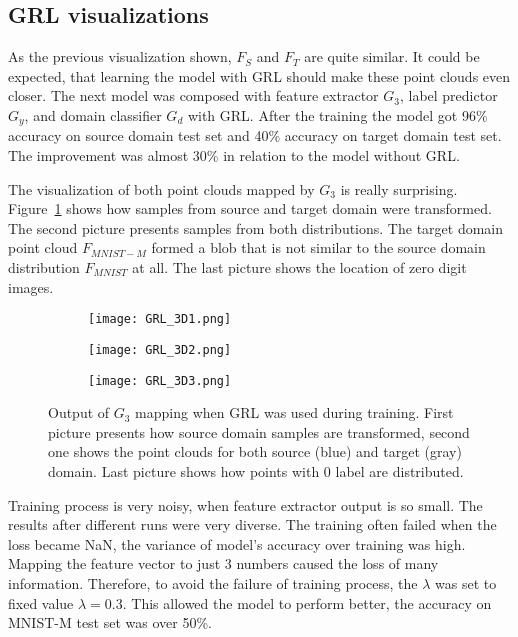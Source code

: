 \documentclass[shortabstract, inz, english]{iithesis}
\begin{document}
\subsection{GRL visualizations}
As the previous visualization shown, $F_{S}$ and $F_{T}$ are quite similar. It could be expected, that learning the model with GRL should make these point clouds even closer. The next model was composed with feature extractor $G_{3}$, label predictor $G_{y}$, and domain classifier $G_{d}$ with GRL. After the training the model got 96\% accuracy on source domain test set and 40\% accuracy on target domain test set. The improvement was almost 30\% in relation to the model without GRL.
\par
The visualization of both point clouds mapped by $G_{3}$ is really surprising.  Figure~\ref{fig:GRL3D} shows how samples from source and target domain were transformed. The second picture presents samples from both distributions. The target domain point cloud $F_{MNIST-M}$ formed a blob that is not similar to the source domain distribution $F_{MNIST}$ at all. The last picture shows the location of zero digit images.

\begin{figure}[htb]%
    \centering
    \begin{subfigure}[b]{0.33\textwidth}
        \texttt{[image: GRL\_3D1.png]}
    \end{subfigure}%
    \begin{subfigure}[b]{0.33\textwidth}
        \texttt{[image: GRL\_3D2.png]}
    \end{subfigure}%
    \begin{subfigure}[b]{0.33\textwidth}
        \texttt{[image: GRL\_3D3.png]}
    \end{subfigure}%
    
    \caption{Output of $G_{3}$ mapping when GRL was used during training. First picture presents how source domain samples are transformed, second one shows the point clouds for both source (blue) and target (gray) domain. Last picture shows how points with 0 label are distributed.}%
    \label{fig:GRL3D}%
\end{figure}
\par
Training process is very noisy, when feature extractor output is so small. The results after different runs were very diverse. The training often failed when the loss became NaN, the variance of model's accuracy over training was high. Mapping the feature vector to just 3 numbers caused the loss of many information. Therefore, to avoid the failure of training process, the $\lambda$ was set to fixed value $\lambda = 0.3$. This allowed the model to perform better, the accuracy on MNIST-M test set was over 50\%.
\end{document}
